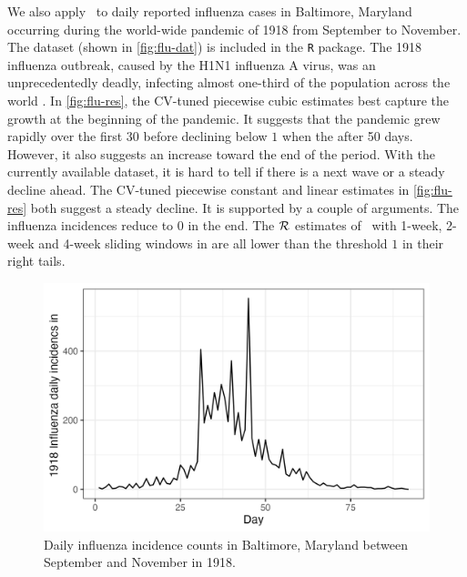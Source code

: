 We also apply \RtEstim\ to daily reported influenza cases in Baltimore, Maryland
occurring during the world-wide pandemic of 1918 from September to November. 
The dataset (shown in \autoref{fig:flu-dat}) is included in the \EpiEstim \texttt{R} package. 
The 1918 influenza outbreak, caused by the H1N1 influenza A virus, was an unprecedentedly
deadly, infecting almost one-third of the population across the world
\citep{taubenberger20061918}. In \autoref{fig:flu-res}, the CV-tuned piecewise
cubic estimates best capture the growth at the beginning of the pandemic. It
suggests that the pandemic grew rapidly over the first 30 before
declining below $1$ when the after 50 days. However, it also suggests an
increase toward the end of the period. With the currently available dataset, it is
hard to tell if there is a next wave or a steady decline ahead. The CV-tuned piecewise 
constant and linear estimates in \autoref{fig:flu-res} both suggest a steady decline. 
It is supported by a couple of arguments. The influenza incidences reduce to $0$ in the end. 
The $\mathcal{R}$ estimates of \EpiEstim\ with 1-week, 2-week and 4-week sliding windows 
in \cite{cori2013new} are all lower than the threshold $1$ in their right tails. 



\begin{figure}[tb]
    \centering
    \includegraphics[width=0.9\linewidth]{fig/flu_dat.png}
    \caption{Daily influenza incidence counts in Baltimore, Maryland between September 
    and November in 1918.} 
    \label{fig:flu-dat}
\end{figure} 

